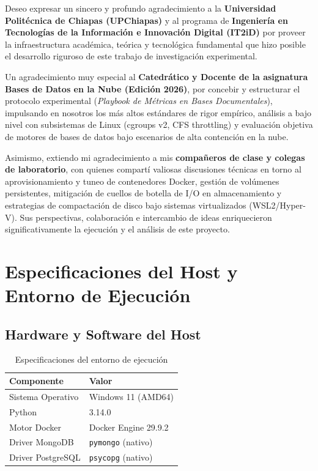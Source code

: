 \documentclass[12pt,a4paper]{article}
\begin{document}
Deseo expresar un sincero y profundo agradecimiento a la \textbf{Universidad Politécnica de Chiapas (UPChiapas)} y al programa de \textbf{Ingeniería en Tecnologías de la Información e Innovación Digital (IT2iD)} por proveer la infraestructura académica, teórica y tecnológica fundamental que hizo posible el desarrollo riguroso de este trabajo de investigación experimental.

Un agradecimiento muy especial al \textbf{Catedrático y Docente de la asignatura Bases de Datos en la Nube (Edición 2026)}, por concebir y estructurar el protocolo experimental (\textit{Playbook de Métricas en Bases Documentales}), impulsando en nosotros los más altos estándares de rigor empírico, análisis a bajo nivel con subsistemas de Linux (cgroups v2, CFS throttling) y evaluación objetiva de motores de bases de datos bajo escenarios de alta contención en la nube.

Asimismo, extiendo mi agradecimiento a mis \textbf{compañeros de clase y colegas de laboratorio}, con quienes compartí valiosas discusiones técnicas en torno al aprovisionamiento y tuneo de contenedores Docker, gestión de volúmenes persistentes, mitigación de cuellos de botella de I/O en almacenamiento y estrategias de compactación de disco bajo sistemas virtualizados (WSL2/Hyper-V). Sus perspectivas, colaboración e intercambio de ideas enriquecieron significativamente la ejecución y el análisis de este proyecto.

\newpage


\section{Especificaciones del Host y Entorno de Ejecución}

\subsection{Hardware y Software del Host}

\begin{table}[H]
\centering
\caption{Especificaciones del entorno de ejecución}
\begin{tabular}{ll}
\toprule
\textbf{Componente}  & \textbf{Valor} \\
\midrule
Sistema Operativo    & Windows 11 (AMD64) \\
Python               & 3.14.0 \\
Motor Docker         & Docker Engine 29.9.2 \\
Driver MongoDB       & \texttt{pymongo} (nativo) \\
Driver PostgreSQL    & \texttt{psycopg} (nativo) \\
\bottomrule
\end{tabular}
\end{table}
\end{document}
